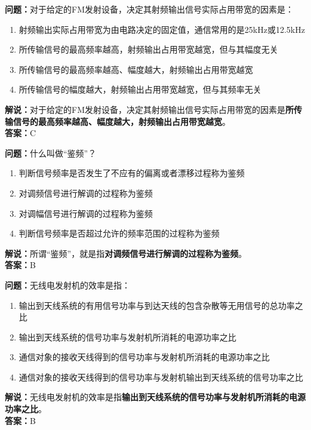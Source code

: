 \textbf{问题：}对于给定的FM发射设备，决定其射频输出信号实际占用带宽的因素是：

\begin{enumerate}[label=\Alph*), leftmargin=1.5cm]
	\item 射频输出实际占用带宽为由电路决定的固定值，通信常用的是25kHz或12.5kHz
	\item 所传输信号的最高频率越高，射频输出占用带宽越宽，但与其幅度无关
	\item 所传输信号的最高频率越高、幅度越大，射频输出占用带宽越宽
	\item 所传输信号的幅度越大，射频输出占用带宽越宽，但与其频率无关
\end{enumerate}

\textbf{解说：}对于给定的FM发射设备，决定其射频输出信号实际占用带宽的因素是\textbf{所传输信号的最高频率越高、幅度越大，射频输出占用带宽越宽}。\\\textbf{答案：}C%



\textbf{问题：}什么叫做“鉴频”？

\begin{enumerate}[label=\Alph*), leftmargin=1.5cm]
	\item 判断信号频率是否发生了不应有的偏离或者漂移过程称为鉴频
	\item 对调频信号进行解调的过程称为鉴频
	\item 对调幅信号进行解调的过程称为鉴频
	\item 判断信号频率是否超过允许的频率范围的过程称为鉴频
\end{enumerate}

\textbf{解说：}所谓“鉴频”，就是指\textbf{对调频信号进行解调的过程称为鉴频}。\\\textbf{答案：}B



\textbf{问题：}无线电发射机的效率是指：

\begin{enumerate}[label=\Alph*), leftmargin=1.5cm]
	\item 输出到天线系统的有用信号功率与到达天线的包含杂散等无用信号的总功率之比
	\item 输出到天线系统的信号功率与发射机所消耗的电源功率之比
	\item 通信对象的接收天线得到的信号功率与发射机所消耗的电源功率之比
	\item 通信对象的接收天线得到的信号功率与发射机输出到天线系统的信号功率之比
\end{enumerate}

\textbf{解说：}无线电发射机的效率是指\textbf{输出到天线系统的信号功率与发射机所消耗的电源功率之比}。\\\textbf{答案：}B%



